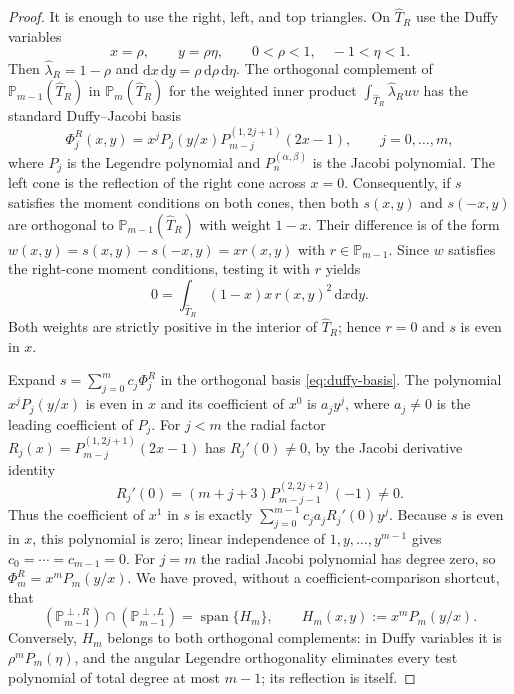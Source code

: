 \documentclass[review,hidelinks,onefignum,onetabnum]{siamart251216}
\begin{document}
\begin{proof}
It is enough to use the right, left, and top triangles.  On
$\widehat T_R$ use the Duffy variables
\[
 x=\rho,\qquad y=\rho\eta,
 \qquad 0<\rho<1,\quad -1<\eta<1.
\]
Then $\widehat\lambda_R=1-\rho$ and
$\mathrm dx\,\mathrm dy=\rho\,\mathrm d\rho\,\mathrm d\eta$.
The orthogonal complement of $\mathbb P_{m-1}(\widehat T_R)$ in
$\mathbb P_m(\widehat T_R)$ for the weighted inner product
$\int_{\widehat T_R}\widehat\lambda_R uv$ has the standard Duffy--Jacobi
basis
\begin{equation}\label{eq:duffy-basis}
 \Phi_j^R(x,y)
 =x^j P_j(y/x)
   P_{m-j}^{(1,2j+1)}(2x-1),
 \qquad j=0,\ldots,m,
\end{equation}
where $P_j$ is the Legendre polynomial and
$P_n^{(\alpha,\beta)}$ is the Jacobi polynomial.  The left cone is the reflection of the right cone across $x=0$.
Consequently, if $s$ satisfies the moment conditions on both cones, then
both $s(x,y)$ and $s(-x,y)$ are orthogonal to
$\mathbb P_{m-1}(\widehat T_R)$ with weight $1-x$.
Their difference is of the form
$w(x,y)=s(x,y)-s(-x,y)=x r(x,y)$ with
$r\in\mathbb P_{m-1}$.
Since $w$ satisfies the right-cone moment conditions, testing it with
$r$ yields
\[
 0=\int_{\widehat T_R}(1-x)x\,r(x,y)^2\,\mathrm dx\mathrm dy.
\]
Both weights are strictly positive in the interior of $\widehat T_R$;
hence $r=0$ and $s$ is even in $x$.

Expand $s=\sum_{j=0}^m c_j\Phi_j^R$ in the orthogonal basis
\eqref{eq:duffy-basis}.  The polynomial
$x^jP_j(y/x)$ is even in $x$ and its coefficient of $x^0$ is
$a_jy^j$, where $a_j\ne0$ is the leading coefficient of $P_j$.
For $j<m$ the radial factor
$R_j(x)=P_{m-j}^{(1,2j+1)}(2x-1)$ has
$R_j'(0)\ne0$, by the Jacobi derivative identity
\[
 R_j'(0)=(m+j+3)
 P_{m-j-1}^{(2,2j+2)}(-1)\ne0.
\]
Thus the coefficient of $x^1$ in $s$ is exactly
$\sum_{j=0}^{m-1}c_ja_jR_j'(0)y^j$.
Because $s$ is even in $x$, this polynomial is zero;
linear independence of $1,y,\ldots,y^{m-1}$ gives
$c_0=\cdots=c_{m-1}=0$.
For $j=m$ the radial Jacobi polynomial has degree zero, so
$\Phi_m^R=x^mP_m(y/x)$.
We have proved, without a coefficient-comparison shortcut, that
\begin{equation}\label{eq:RL-intersection}
 \left(\mathbb P_{m-1}^{\perp,R}\right)
 \cap
 \left(\mathbb P_{m-1}^{\perp,L}\right)
 =\operatorname{span}\{H_m\},\qquad
 H_m(x,y):=x^mP_m(y/x).
\end{equation}
Conversely, $H_m$ belongs to both orthogonal complements: in Duffy
variables it is $\rho^mP_m(\eta)$, and the angular Legendre
orthogonality eliminates every test polynomial of total degree at most
$m-1$; its reflection is itself.


\end{proof}
\end{document}
